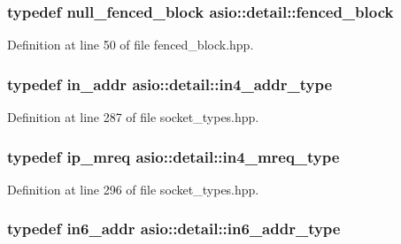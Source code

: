 \hypertarget{namespaceasio_1_1detail_ab15bb9aa4ee801fe8fdc4c687e4b2653}{}
\subsubsection[{fenced\+\_\+block}]{\setlength{\rightskip}{0pt plus 5cm}typedef {\bf null\+\_\+fenced\+\_\+block} {\bf asio\+::detail\+::fenced\+\_\+block}}\label{namespaceasio_1_1detail_ab15bb9aa4ee801fe8fdc4c687e4b2653}


Definition at line 50 of file fenced\+\_\+block.\+hpp.

\hypertarget{namespaceasio_1_1detail_a8e45a79a5ed322972acbf5c93782cef8}{}
\subsubsection[{in4\+\_\+addr\+\_\+type}]{\setlength{\rightskip}{0pt plus 5cm}typedef in\+\_\+addr {\bf asio\+::detail\+::in4\+\_\+addr\+\_\+type}}\label{namespaceasio_1_1detail_a8e45a79a5ed322972acbf5c93782cef8}


Definition at line 287 of file socket\+\_\+types.\+hpp.

\hypertarget{namespaceasio_1_1detail_abe51233cc09e73aeac58af43675ad976}{}
\subsubsection[{in4\+\_\+mreq\+\_\+type}]{\setlength{\rightskip}{0pt plus 5cm}typedef ip\+\_\+mreq {\bf asio\+::detail\+::in4\+\_\+mreq\+\_\+type}}\label{namespaceasio_1_1detail_abe51233cc09e73aeac58af43675ad976}


Definition at line 296 of file socket\+\_\+types.\+hpp.

\hypertarget{namespaceasio_1_1detail_a6fbf4772e59936aa45276af1dc653ab4}{}
\subsubsection[{in6\+\_\+addr\+\_\+type}]{\setlength{\rightskip}{0pt plus 5cm}typedef in6\+\_\+addr {\bf asio\+::detail\+::in6\+\_\+addr\+\_\+type}}\label{namespaceasio_1_1detail_a6fbf4772e59936aa45276af1dc653ab4}


